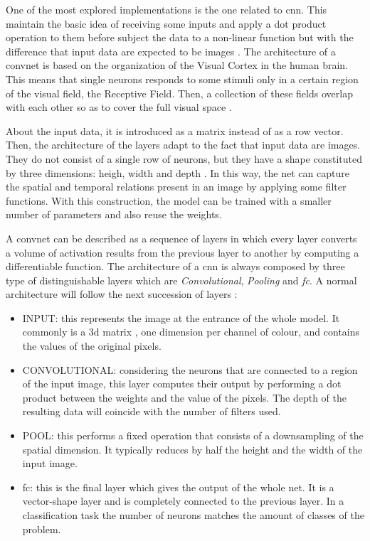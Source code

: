 
	One of the most explored implementations is the one related to \acrfull{cnn}. This maintain the basic idea of receiving some inputs and apply a dot product operation to them before subject the data to a non-linear function but with the difference that input data are expected to be images \cite{Karpathy2016}. The architecture of a \acrlong{convnet} is based on the organization of the Visual Cortex in the human brain. This means that single neurons responds to some stimuli only in a certain region of the visual field, the Receptive Field. Then, a collection of these fields overlap with each other so as to cover the full visual space \cite{Saha2018}.
	
	About the input data, it is introduced as a matrix instead of as a row vector. Then, the architecture of the layers adapt to the fact that input data are images. They do not consist of a single row of neurons, but they have a shape constituted by three dimensions: heigh, width and depth \cite{Karpathy2016} . In this way, the net can capture the spatial and temporal relations present in an image by applying some filter functions. With this construction, the model can be trained with a smaller number of parameters and also reuse the weights.
	
	A \acrlong{convnet} can be described as a sequence of layers in which every layer converts a volume of activation results from the previous layer to another by computing a differentiable function. The architecture of a \acrshort{cnn} is always composed by three type of distinguishable layers which are \textit{Convolutional}, \textit{Pooling} and \textit{\acrlong{fc}}. A normal architecture will follow the next succession of layers \cite{Karpathy2016}:
	
	\begin{itemize}
		\item INPUT: this represents the image at the entrance of the whole model. It commonly is a 3\acrshort{d} matrix , one dimension per channel of colour, and contains the values of the original pixels.
		\item CONVOLUTIONAL: considering the neurons that are connected to a region of the input image, this layer computes their output by performing a dot product between the weights and the value of the pixels. The depth of the resulting data will coincide with the number of filters used.
		\item POOL: this performs a fixed operation that consists of a downsampling of the spatial dimension. It typically reduces by half the height and the width of the input image.
		\item \acrshort{fc}: this is the final layer which gives the output of the whole net. It is a vector-shape layer and is completely connected to the previous layer. In a classification task the number of neurons matches the amount of classes of the problem.
	\end{itemize}
	
